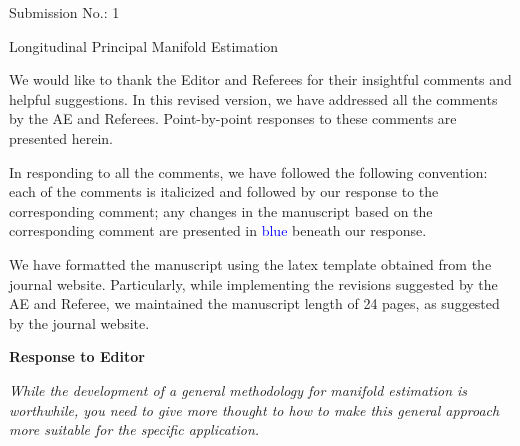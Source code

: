 \documentclass{article}
\theoremstyle{definition}
\begin{document}
\begin{center}

{\large Submission No.: 1}

{\large \bigskip Longitudinal Principal Manifold Estimation}
\end{center}

\noindent We would like to thank the Editor and Referees for their insightful comments and helpful suggestions. In this revised version, we have addressed all the comments by the AE and Referees. Point-by-point responses to these comments are presented herein. 

In responding to all the comments, we have followed the following convention: each of the comments is italicized and followed by our response to the corresponding comment; any changes in the manuscript based on the corresponding comment are presented in \textcolor{blue}{blue} beneath our response. 

We have formatted the manuscript using the latex template obtained from the journal website. Particularly, while implementing the revisions suggested by the AE and Referee, we maintained the manuscript length of 24 pages, as suggested by the journal website. 

\vspace{0.3in}


\large{\textbf{Response to Editor}}

\vspace{0.3in}

{\it While the development of a general methodology for manifold estimation is worthwhile, you need to give more thought to how to make this general approach more suitable for the specific application. }
\end{document}
